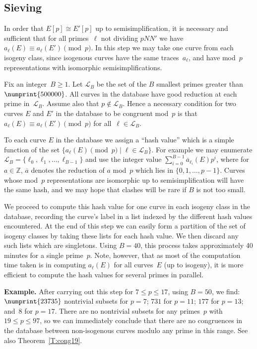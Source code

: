 \documentclass[twoside,leqno,symbols-for-thanks, draft]{rmi}
\numberwithin{equation}{section}
\newcommand{\Z}{\mathbb{Z}}
\newcommand{\calL}{\mathcal{L}}
\theoremstyle{remark}
\begin{document}
\subsection{Sieving}
In order that $E[p]\cong E'[p]$ up to semisimplification, it is
necessary and sufficient that for all primes~$\ell$ not dividing
$pNN'$ we have $a_{\ell}(E)\equiv a_{\ell}(E')\pmod{p}$.  In this step
we may take one curve from each isogeny class, since isogenous curves
have the same traces~$a_\ell$, and have mod~$p$ representations with
isomorphic semisimplifications.

Fix an integer~$B\ge1$.  Let $\calL_B$ be the set of the $B$ smallest
primes greater than $\numprint{500000}$. All curves in the database
have good reduction at each prime in~$\calL_B$.  Assume also that
$p\notin\calL_B$. Hence a necessary condition for
two curves $E$ and $E'$ in the database to be congruent mod~$p$ is
that $a_{\ell}(E)\equiv a_{\ell}(E')\pmod{p}$ for all~$\ell\in\calL_B$.

To each curve $E$ in the database we assign a ``hash value'' which is
a simple function of the set $\{a_{\ell}(E)\pmod{p}\mid
\ell\in\calL_B\}$.  For example we may enumerate
$\calL_B=\{\ell_0,\ell_1,\dots,\ell_{B-1}\}$ and use the integer value
$\sum_{i=0}^{B-1}\overline{a}_{\ell_i}(E)p^i$, where for $a\in\Z$,
$\overline{a}$ denotes the reduction of $a$ mod~$p$ which lies in
$\{0,1,\dots,p-1\}$.  Curves whose mod~$p$ representations are
isomorphic up to semisimplification will have the same hash, and we
may hope that clashes will be rare if $B$ is not too small.

We proceed to compute this hash value for one curve in each isogeny
class in the database, recording the curve's label in a list indexed
by the different hash values encountered.  At the end of this step we
can easily form a partition of the set of isogeny classes by taking
these lists for each hash value.  We then discard any such lists which
are singletons.  Using $B=40$, this process takes approximately 40
minutes for a single prime~$p$.  Note, however, that as most of the
computation time taken is in computing $a_{\ell}(E)$ for all
curves~$E$ (up to isogeny), it is more efficient to compute the hash
values for several primes in parallel.

{\bf Example.} After carrying out this step for $7\le p\le17$, using
$B=50$, we find: $\numprint{23735}$ nontrivial subsets for $p=7$;
$731$ for $p=11$; $177$ for $p=13$; and~$8$ for $p=17$.  There are no
nontrivial subsets for any primes~$p$ with $19\le p\le97$, so we can
immediately conclude that there are no congruences in the database
between non-isogenous curves modulo any prime in this range.  See also
Theorem~\ref{T:cong19}.
\end{document}
